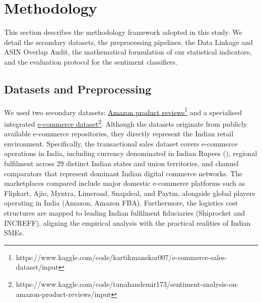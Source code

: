 \documentclass[authoryear,review,3p,times,12pt]{elsarticle}
\begin{document}
\section{Methodology}
\label{sec:method}
This section describes the methodology framework adopted in this study. We detail the secondary datasets, the preprocessing pipelines, the Data Linkage and ASIN Overlap Audit, the mathematical formulation of our statistical indicators, and the evaluation protocol for the sentiment classifiers.

\subsection{Datasets and Preprocessing}
We used two secondary datasets: \href{https://www.kaggle.com/code/kartikmanekar007/e-commerce-sales-dataset/input}{Amazon product reviews\footnote{https://www.kaggle.com/code/kartikmanekar007/e-commerce-sales-dataset/input}} and a specialised integrated \href{https://www.kaggle.com/code/tunahandemir173/sentiment-analysis-on-amazon-product-reviews/input}{e-commerce dataset\footnote{https://www.kaggle.com/code/tunahandemir173/sentiment-analysis-on-amazon-product-reviews/input}}. Although the datasets originate from publicly available e-commerce repositories, they directly represent the Indian retail environment. Specifically, the transactional sales dataset covers e-commerce operations in India, including currency denominated in Indian Rupees (\rupee), regional fulfilment across 29 distinct Indian states and union territories, and channel comparators that represent dominant Indian digital commerce networks. The marketplaces compared include major domestic e-commerce platforms such as Flipkart, Ajio, Myntra, Limeroad, Snapdeal, and Paytm, alongside global players operating in India (Amazon, Amazon FBA). Furthermore, the logistics cost structures are mapped to leading Indian fulfilment fiduciaries (Shiprocket and INCREFF), aligning the empirical analysis with the practical realities of Indian SMEs.
\end{document}
